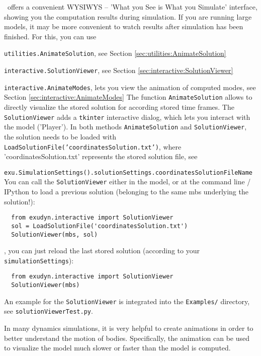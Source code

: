\label{secSolutionViewer}
\codeName\ offers a convenient WYSIWYS -- 'What you See is What you Simulate' interface, showing you the computation results during simulation.
If you are running large models, it may be more convenient to watch results after simulation has been finished.
For this, you can use
\bi
  \item \texttt{utilities.AnimateSolution}, see Section \ref{sec:utilities:AnimateSolution}
  \item \texttt{interactive.SolutionViewer}, see Section \ref{sec:interactive:SolutionViewer}
  \item \texttt{interactive.AnimateModes}, lets you view the animation of computed modes, see Section \ref{sec:interactive:AnimateModes}
\ei
The function \texttt{AnimateSolution} allows to directly visualize the stored solution for according stored time frames.
The \texttt{SolutionViewer} adds a \texttt{tkinter} interactive dialog, which lets you interact with the model ('Player').
In both methods \texttt{AnimateSolution} and \texttt{SolutionViewer}, the solution needs to be loaded with
\texttt{LoadSolutionFile('coordinatesSolution.txt')}, where 'coordinatesSolution.txt' represents the stored solution file, 
see 
\bi
  \item \texttt{exu.SimulationSettings().solutionSettings.coordinatesSolutionFileName}
\ei
You can call the \texttt{SolutionViewer} either in the model, or at the command line / IPython to load a previous solution (belonging to the same mbs underlying the solution!):
\pythonstyle\begin{lstlisting}
  from exudyn.interactive import SolutionViewer
  sol = LoadSolutionFile('coordinatesSolution.txt')
  SolutionViewer(mbs, sol)
\end{lstlisting}
, you can just reload the last stored solution (according to your \texttt{simulationSettings}):
\pythonstyle\begin{lstlisting}
  from exudyn.interactive import SolutionViewer
  SolutionViewer(mbs)
\end{lstlisting}
An example for the \texttt{SolutionViewer} is integrated into the \texttt{Examples/} directory, see \texttt{solutionViewerTest.py}. 

\label{secGeneratingAnimations}
%
In many dynamics simulations, it is very helpful to create animations in order to better understand the motion of bodies. Specifically, the animation can be used to visualize the model much slower or faster than the model is computed.

